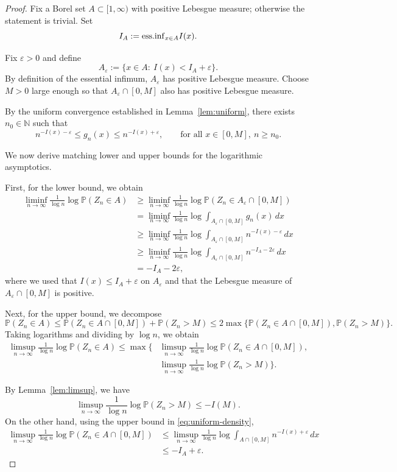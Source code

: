 \documentclass[11pt,reqno]{amsart}
\theoremstyle{definition}
\theoremstyle{remark}
\numberwithin{equation}{section}
\newcommand{\essinf}{{\rm ess.inf}}
\newcommand{\PP}{\mathbb{P}}
\begin{document}
\begin{proof}
Fix a Borel set $A\subset[1,\infty)$ with positive Lebesgue measure; otherwise the statement is trivial.  
Set
\[
I_A:=\essinf_{x\in A} I(x).
\]

Fix $\varepsilon>0$ and define
\[
A_\varepsilon:=\{x\in A:\ I(x)<I_A+\varepsilon\}.
\]
By definition of the essential infimum, $A_\varepsilon$ has positive Lebesgue measure.  
Choose $M>0$ large enough so that $A_\varepsilon\cap[0,M]$ also has positive Lebesgue measure.

By the uniform convergence established in Lemma~\ref{lem:uniform}, there exists $n_0\in\mathbb{N}$ such that
\begin{equation}\label{eq:uniform-density}
n^{-I(x)-\varepsilon}
\le
g_n(x)
\le
n^{-I(x)+\varepsilon},
\qquad
\text{for all } x\in[0,M],\ n\ge n_0.
\end{equation}

We now derive matching lower and upper bounds for the logarithmic asymptotics.

First, for the lower bound, we obtain
\begin{align*}
\liminf_{n\to\infty}\frac{1}{\log n}\log\PP(Z_n\in A)
&\ge
\liminf_{n\to\infty}\frac{1}{\log n}\log\PP(Z_n\in A_\varepsilon\cap[0,M])\\
&=
\liminf_{n\to\infty}\frac{1}{\log n}
\log\int_{A_\varepsilon\cap[0,M]} g_n(x)\,dx\\
&\ge
\liminf_{n\to\infty}\frac{1}{\log n}
\log\int_{A_\varepsilon\cap[0,M]} n^{-I(x)-\varepsilon}\,dx\\
&\ge
\liminf_{n\to\infty}\frac{1}{\log n}
\log\int_{A_\varepsilon\cap[0,M]} n^{-I_A-2\varepsilon}\,dx\\
&=
-I_A-2\varepsilon,
\end{align*}
where we used that $I(x)\le I_A+\varepsilon$ on $A_\varepsilon$ and that the Lebesgue measure of $A_\varepsilon\cap[0,M]$ is positive.

Next, for the upper bound, we decompose
\[
\PP(Z_n\in A)
\le
\PP(Z_n\in A\cap[0,M])+\PP(Z_n>M)
\le
2\max\{\PP(Z_n\in A\cap[0,M]),\PP(Z_n>M)\}.
\]
Taking logarithms and dividing by $\log n$, we obtain
\begin{align*}
\limsup_{n\to\infty}\frac{1}{\log n}\log\PP(Z_n\in A)
\le
\max\Bigg\{
&\limsup_{n\to\infty}\frac{1}{\log n}\log\PP(Z_n\in A\cap[0,M]),\\
&\limsup_{n\to\infty}\frac{1}{\log n}\log\PP(Z_n>M)
\Bigg\}.
\end{align*}

By Lemma~\ref{lem:limsup}, we have
\[
\limsup_{n\to\infty}\frac{1}{\log n}\log\PP(Z_n>M)\le -I(M).
\]
On the other hand, using the upper bound in \eqref{eq:uniform-density},
\begin{align*}
\limsup_{n\to\infty}\frac{1}{\log n}\log\PP(Z_n\in A\cap[0,M])
&\le
\limsup_{n\to\infty}\frac{1}{\log n}
\log\int_{A\cap[0,M]} n^{-I(x)+\varepsilon}\,dx\\
&\le
-I_A+\varepsilon.
\end{align*}


\end{proof}
\end{document}
